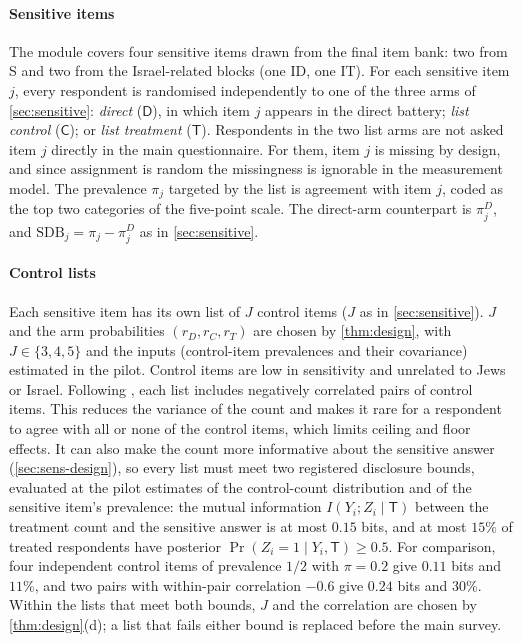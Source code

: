 \paragraph{Sensitive items}
The module covers four sensitive items drawn from the final item bank: two from S and two from the Israel-related blocks (one ID, one IT). For each sensitive item $j$, every respondent is randomised independently to one of the three arms of \cref{sec:sensitive}: \emph{direct} ($\mathsf{D}$), in which item $j$ appears in the direct battery; \emph{list control} ($\mathsf{C}$); or \emph{list treatment} ($\mathsf{T}$). Respondents in the two list arms are not asked item $j$ directly in the main questionnaire. For them, item $j$ is missing by design, and since assignment is random the missingness is ignorable in the measurement model. The prevalence $\pi_j$ targeted by the list is agreement with item $j$, coded as the top two categories of the five-point scale. The direct-arm counterpart is $\pi^D_j$, and $\mathrm{SDB}_j=\pi_j-\pi^D_j$ as in \cref{sec:sensitive}.

\paragraph{Control lists}
Each sensitive item has its own list of $J$ control items ($J$ as in \cref{sec:sensitive}). $J$ and the arm probabilities $(r_D,r_C,r_T)$ are chosen by \cref{thm:design}, with $J\in\{3,4,5\}$ and the inputs (control-item prevalences and their covariance) estimated in the pilot. Control items are low in sensitivity and unrelated to Jews or Israel. Following \citet{glynn2013}, each list includes negatively correlated pairs of control items. This reduces the variance of the count and makes it rare for a respondent to agree with all or none of the control items, which limits ceiling and floor effects. It can also make the count more informative about the sensitive answer (\cref{sec:sens-design}), so every list must meet two registered disclosure bounds, evaluated at the pilot estimates of the control-count distribution and of the sensitive item's prevalence: the mutual information $I(Y_i;Z_i\mid\mathsf{T})$ between the treatment count and the sensitive answer is at most $0.15$ bits, and at most $15\%$ of treated respondents have posterior $\Pr(Z_i=1\mid Y_i,\mathsf{T})\ge0.5$. For comparison, four independent control items of prevalence $1/2$ with $\pi=0.2$ give $0.11$ bits and $11\%$, and two pairs with within-pair correlation $-0.6$ give $0.24$ bits and $30\%$. Within the lists that meet both bounds, $J$ and the correlation are chosen by \cref{thm:design}(d); a list that fails either bound is replaced before the main survey.

